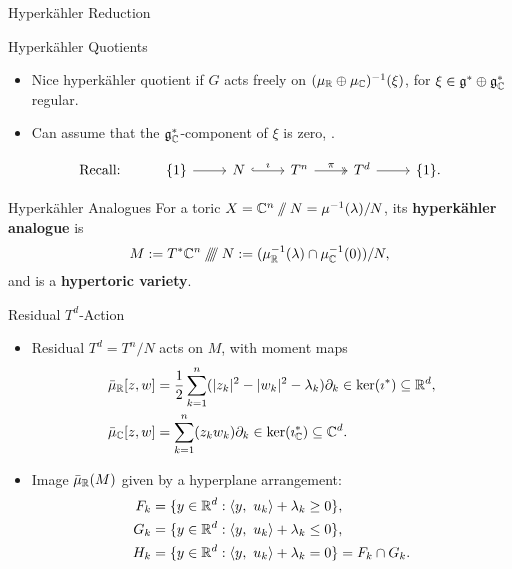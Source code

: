\begin{frame}[fragile]{Hyperk{\"a}hler Reduction}
    \begin{block}{Hyperk{\"a}hler Quotients \cite{BD2000}}
        \begin{itemize}
            \item Nice hyperk{\"a}hler quotient if $G$ acts freely on $(\mu_{\mathbb{R}} \oplus \mu_{\mathbb{C}})^{-1}(\xi)$, for $\xi \in \mathfrak{g}^{\ast} \oplus \mathfrak{g}_{\mathbb{C}}^{\ast}$ regular.
            \item Can assume that the $\mathfrak{g}_{\mathbb{C}}^{\ast}$-component of $\xi$ is zero, \cite{BD2000}.
            \end{itemize}
            \[
                \begin{tikzcd}
                    \text{Recall:} & \{1\} \arrow[r] & N \arrow[r, "\imath", hook] & T^{n} \arrow[r, "\pi", two heads] & T^{d} \arrow[r] & \{1\}.
                \end{tikzcd}
            \]
    \end{block}
    \begin{block}{Hyperk{\"a}hler Analogues \cite{proudfoot2004}}
        For a toric $X = \mathbb{C}^{n} \sslash N = \mu^{-1}(\lambda) / N$, its \textbf{hyperk{\"a}hler analogue} is
        $$ M := T^{\ast}\mathbb{C}^{n} \mathbin{/\mkern-6mu/\mkern-6mu/\mkern-6mu/} N := ( \mu_{\mathbb{R}}^{-1}(\lambda) \cap \mu_{\mathbb{C}}^{-1}(0) ) / N, $$
        and is a \textbf{hypertoric variety}.
    \end{block}
\end{frame}

\begin{frame}{Residual $T^{d}$-Action}
    \begin{itemize}
        \item Residual $T^{d} = T^{n}/N$ acts on $M$, with moment maps
            \begin{equation*}
                \begin{split}
                    \bar{\mu}_{\mathbb{R}}[z,w] &= \frac{1}{2}\sum_{k=1}^{n} ( |z_{k}|^{2} - |w_{k}|^{2} - \lambda_{k} )\partial_{k} \in \ker(\imath^{\ast}) \subseteq \mathbb{R}^{d}, \\
                    \bar{\mu}_{\mathbb{C}}[z,w] &= \sum_{k=1}^{n}(z_{k}w_{k})\partial_{k} \in \ker(\imath^{\ast}_{\mathbb{C}}) \subseteq \mathbb{C}^{d}.
                \end{split}
            \end{equation*}
            \item Image $\bar{\mu}_{\mathbb{R}}(M)$ given by a hyperplane arrangement:
            \begin{equation*}
                \begin{split}
                    F_{k} &= \{ y \in \mathbb{R}^{d} : \langle y,\ u_{k} \rangle + \lambda_{k} \geq 0 \}, \\
                    G_{k} &= \{ y \in \mathbb{R}^{d} : \langle y,\ u_{k} \rangle + \lambda_{k} \leq 0 \}, \\
                    H_{k} &= \{ y \in \mathbb{R}^{d} : \langle y,\ u_{k} \rangle + \lambda_{k} = 0 \} = F_{k} \cap G_{k}.
                \end{split}
            \end{equation*}
        \end{itemize}
\end{frame}

